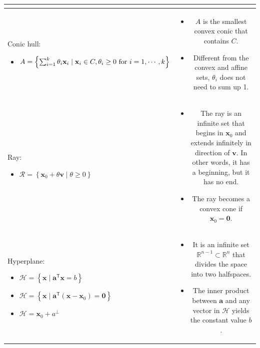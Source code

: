 \documentclass{article}
\newcommand{\trans}{\mathsf{T}}
\begin{document}
\begin{table}[H]
\begin{tabularx}{\textwidth}{|A|C|}
\begin{itemize}[leftmargin=*]
\end{itemize}\\
\hline
Conic hull:
\begin{itemize}[leftmargin=*]
    \item $A = \left\{ \sum_{i=1}^{k} \theta_i\mathbf{x}_i \mid \mathbf{x}_i \in C, \theta_i \geq 0 \textnormal{ for } i=1,\cdots, k \right\}$
\end{itemize} & \vspace{-3.5ex}
\begin{itemize}[leftmargin=*]
    \item $A$ is the smallest convex conic that contains $C$.
    \item Different from the convex and affine sets, \(\theta_i\) does not need to sum up 1.
\end{itemize}\\
\hline
Ray:
\begin{itemize}[leftmargin=*]
    \item \(\mathcal{R} = \left\{ \mathbf{x}_0 + \theta \mathbf{v} \mid \theta \geq 0 \right\}\)
\end{itemize} & \vspace{-3.5ex} \begin{itemize}[leftmargin=*]
    \item The ray is an infinite set that begins in \(\mathbf{x}_0\) and extends infinitely in direction of \(\mathbf{v}\). In other words, it has a beginning, but it has no end.
    \item The ray becomes a convex cone if \(\mathbf{x}_0 = \mathbf{0}.\)
\end{itemize} \\
\hline
Hyperplane:
\begin{itemize}[leftmargin=*]
    \item \( \mathcal{H} = \left\{ \mathbf{x} \mid \mathbf{a}^\trans \mathbf{x} = b \right\}\)
    \item \(\mathcal{H} = \left\{ \mathbf{x} \mid \mathbf{a}^\trans (\mathbf{x} - \mathbf{x}_{0}) = \mathbf{0} \right\}\)
    \item \(\mathcal{H} = \mathbf{x}_0 + a^{\perp} \)
\end{itemize} & \vspace{-3.5ex}
\begin{itemize}[leftmargin=*]
    \item It is an infinite set \(\mathbb{R}^{n-1} \subset \mathbb{R}^{n}\) that divides the space into two halfspaces.
    \item The inner product between \(\mathbf{a}\) and any vector in \(\mathcal{H}\) yields the constant value \(b\).

\end{itemize}
\end{tabularx}
\end{table}
\end{document}
